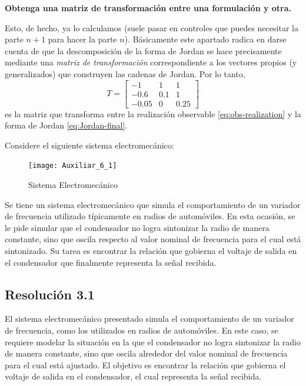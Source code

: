 \documentclass[
  11pt,
  letterpaper,
   addpoints,
  answers
  ]{exam}
\begin{document}
\begin{questions}
\begin{solution}
\textbf{Obtenga una matriz de transformación entre una formulación y otra.}

Esto, de hecho, ya lo calculamos (suele pasar en controles que puedes necesitar la parte $n\!+\!1$ para hacer la parte $n$). Básicamente este apartado radica en darse cuenta de que la descomposición de la forma de Jordan se hace precisamente mediante una \emph{matriz de transformación} correspondiente a los vectores propios (y generalizados) que construyen las cadenas de Jordan. Por lo tanto,
\begin{equation}
\boxed{
T=
\begin{bmatrix}
-1 & 1 & 1\\
-0.6 & 0.1 & 1\\
-0.05 & 0 & 0.25
\end{bmatrix}
}
\end{equation}
es la matriz que transforma entre la realización observable \eqref{eq:obs-realization} y la forma de Jordan \eqref{eq:Jordan-final}.

\end{solution}

  \question Considere el siguiente sistema electromecánico:
  \begin{figure}[H]
    \centering
    \texttt{[image: Auxiliar\_6\_1]}
    \caption{Sistema Electromecánico}
  \end{figure}

  Se tiene un sistema electromecánico que simula el comportamiento de un variador de frecuencia utilizado típicamente en radios de automóviles. En esta ocasión, se le pide simular que el condensador no logra sintonizar la radio de manera constante, sino que oscila respecto al valor nominal de frecuencia para el cual está sintonizado. Su tarea es encontrar la relación que gobierna el voltaje de salida en el condensador que finalmente representa la señal recibida.
\begin{solution}

\subsection*{Resolución 3.1}

El sistema electromecánico presentado simula el comportamiento de un variador de frecuencia, como los utilizados en radios de automóviles. En este caso, se requiere modelar la situación en la que el condensador no logra sintonizar la radio de manera constante, sino que oscila alrededor del valor nominal de frecuencia para el cual está ajustado. El objetivo es encontrar la relación que gobierna el voltaje de salida en el condensador, el cual representa la señal recibida.


\end{solution}
\end{questions}
\end{document}
